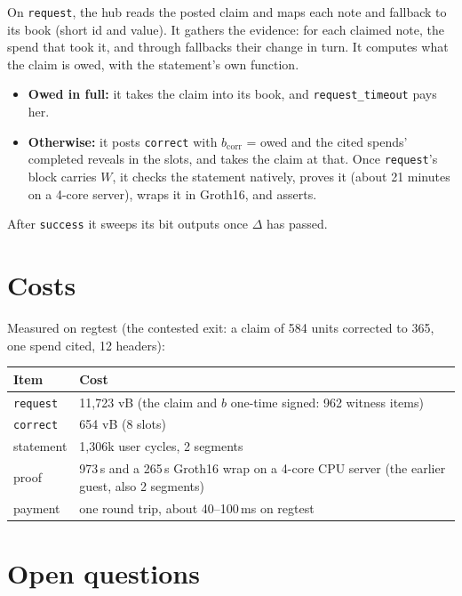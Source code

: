\documentclass[11pt]{article}
\newcommand{\bcorr}{b_{\mathrm{corr}}}
\newcommand{\tx}[1]{\texttt{#1}}
\begin{document}
On \tx{request}, the hub reads the posted claim and maps each note and
fallback to its book (short id and value). It gathers the evidence: for
each claimed note, the spend that took it, and through fallbacks their
change in turn. It computes what the claim is owed, with the
statement's own function.
\begin{itemize}[nosep]
\item \textbf{Owed in full:} it takes the claim into its book, and
  \tx{request\_timeout} pays her.
\item \textbf{Otherwise:} it posts \tx{correct} with $\bcorr$ = owed and
  the cited spends' completed reveals in the slots, and takes the claim
  at that. Once \tx{request}'s block carries $W$, it checks the
  statement natively, proves it (about 21 minutes on a 4-core server),
  wraps it in Groth16, and asserts.
\end{itemize}
After \tx{success} it sweeps its bit outputs once $\Delta$ has passed.

\section{Costs}

Measured on regtest (the contested exit: a claim of 584 units corrected
to 365, one spend cited, 12 headers):

\begin{center}
\begin{tabularx}{0.9\linewidth}{lL}
\toprule
Item & Cost \\
\midrule
\tx{request} & 11,723 vB (the claim and $b$ one-time signed: 962 witness items) \\
\tx{correct} & 654 vB (8 slots) \\
statement & 1,306k user cycles, 2 segments \\
proof & 973\,s and a 265\,s Groth16 wrap on a 4-core CPU server (the earlier guest, also 2 segments) \\
payment & one round trip, about 40--100\,ms on regtest \\
\bottomrule
\end{tabularx}
\end{center}

\section{Open questions}
\end{document}
